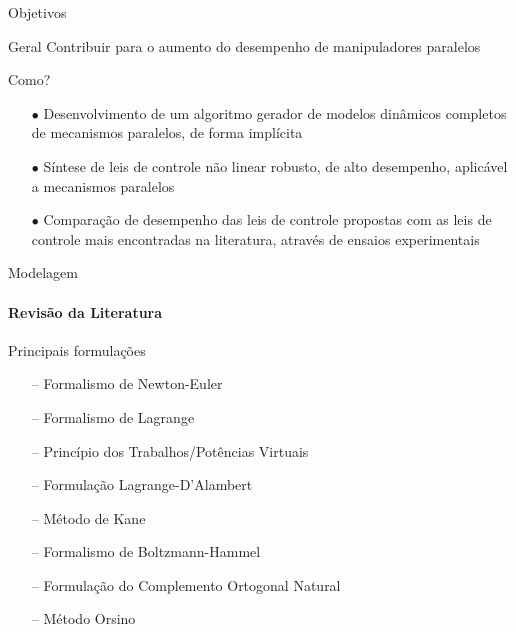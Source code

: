 \documentclass[25pt,landscape]{beamer}
\begin{document}
\begin{frame}{Objetivos}
	\pause
	\begin{block}{Geral}
		Contribuir para o aumento do desempenho de manipuladores paralelos
	\end{block}
	\pause
	\begin{exampleblock}{Como?}
		\pause
		\begin{itemize}
			\item[$\bullet$] Desenvolvimento de um algoritmo gerador de modelos din\^amicos completos de mecanismos paralelos, de forma impl\'icita \\[8pt]
			\pause
			\item[$\bullet$] S\'intese de leis de controle  n\~ao linear robusto, de alto desempenho, aplic\'avel a mecanismos paralelos \\[8pt]
			\pause
			\item[$\bullet$] Compara\c{c}\~ao de desempenho das leis de controle propostas com as leis de controle mais encontradas na literatura, atrav\'es de ensaios experimentais \\[8pt]
		\end{itemize}
	\end{exampleblock}
\end{frame}

\begin{frame}{Modelagem}
    \framesubtitle{Revis\~ao da Literatura}
    \pause
    \begin{block}{Principais formula\c{c}\~oes}
        \begin{itemize}
            \item[--] Formalismo de Newton-Euler \\[4pt]
            \item[--] Formalismo de Lagrange \\[4pt]
            \item[--] Princ\'ipio dos Trabalhos/Pot\^encias Virtuais \\[4pt]
            \item[--] Formula\c{c}\~ao Lagrange-D'Alambert \\[4pt]
            \item[--] M\'etodo de Kane \\[4pt]
            \item[--] Formalismo de Boltzmann-Hammel \\[4pt]
            \item[--] Formula\c{c}\~ao do Complemento Ortogonal Natural \\[4pt]
            \item[--] M\'etodo Orsino 
        \end{itemize}
    \end{block}
\end{frame}
\end{document}
